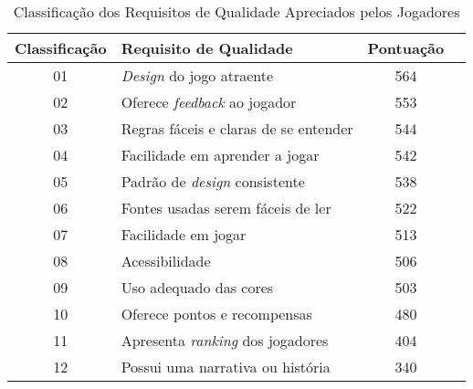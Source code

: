 \begin{table}[htbp]
\centering
\caption{Classificação dos Requisitos de Qualidade Apreciados pelos Jogadores}
\label{tab:req-pont}
\begin{tabular}{clcl}
\hline
\multicolumn{1}{|c|}{\textbf{Classificação}} & \multicolumn{1}{l|}{\textbf{Requisito de Qualidade}}       & \multicolumn{1}{c|}{\textbf{Pontuação}}  \\ \hline
\multicolumn{1}{|c|}{01}                  & \multicolumn{1}{l|}{\textit{Design} do jogo atraente}               & \multicolumn{1}{c|}{564}           \\ \hline
\multicolumn{1}{|c|}{02}                  & \multicolumn{1}{l|}{Oferece \textit{feedback} ao jogador}           & \multicolumn{1}{c|}{553}           \\ \hline
\multicolumn{1}{|c|}{03}                  & \multicolumn{1}{l|}{Regras fáceis e claras de se entender} & \multicolumn{1}{c|}{544}                    \\ \hline
\multicolumn{1}{|c|}{04}                  & \multicolumn{1}{l|}{Facilidade em aprender a jogar}        & \multicolumn{1}{c|}{542}                    \\ \hline
\multicolumn{1}{|c|}{05}                  & \multicolumn{1}{l|}{Padrão de \textit{design} consistente}          & \multicolumn{1}{c|}{538}           \\ \hline
\multicolumn{1}{|c|}{06}                  & \multicolumn{1}{l|}{Fontes usadas serem fáceis de ler}     & \multicolumn{1}{c|}{522}                    \\ \hline
\multicolumn{1}{|c|}{07}                  & \multicolumn{1}{l|}{Facilidade em jogar}                   & \multicolumn{1}{c|}{513}                    \\ \hline
\multicolumn{1}{|c|}{08}                  & \multicolumn{1}{l|}{Acessibilidade}                        & \multicolumn{1}{c|}{506}                    \\ \hline
\multicolumn{1}{|c|}{09}                  & \multicolumn{1}{l|}{Uso adequado das cores}                & \multicolumn{1}{c|}{503}                    \\ \hline
\multicolumn{1}{|c|}{10}                  & \multicolumn{1}{l|}{Oferece pontos e recompensas}          & \multicolumn{1}{c|}{480}                    \\ \hline
\multicolumn{1}{|c|}{11}                  & \multicolumn{1}{l|}{Apresenta \textit{ranking} dos jogadores}       & \multicolumn{1}{c|}{404}           \\ \hline
\multicolumn{1}{|c|}{12}                  & \multicolumn{1}{l|}{Possui uma narrativa ou história}      & \multicolumn{1}{c|}{340}                    \\ \hline

\end{tabular}
\end{table}
